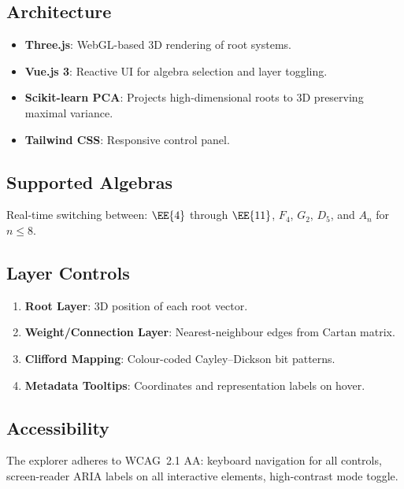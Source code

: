 \subsection{Architecture}

\begin{itemize}
    \item \textbf{Three.js}: WebGL-based 3D rendering of root systems.
    \item \textbf{Vue.js 3}: Reactive UI for algebra selection and layer
          toggling.
    \item \textbf{Scikit-learn PCA}: Projects high-dimensional roots to 3D
          preserving maximal variance.
    \item \textbf{Tailwind CSS}: Responsive control panel.
\end{itemize}

\subsection{Supported Algebras}

Real-time switching between: $\EE{4}$ through $\EE{11}$, $F_4$, $G_2$,
$D_5$, and $A_n$ for $n \le 8$.

\subsection{Layer Controls}

\begin{enumerate}
    \item \textbf{Root Layer}: 3D position of each root vector.
    \item \textbf{Weight/Connection Layer}: Nearest-neighbour edges from
          Cartan matrix.
    \item \textbf{Clifford Mapping}: Colour-coded Cayley--Dickson bit
          patterns.
    \item \textbf{Metadata Tooltips}: Coordinates and representation labels
          on hover.
\end{enumerate}

\subsection{Accessibility}

The explorer adheres to WCAG~2.1 AA: keyboard navigation for all
controls, screen-reader ARIA labels on all interactive elements, high-contrast
mode toggle.


